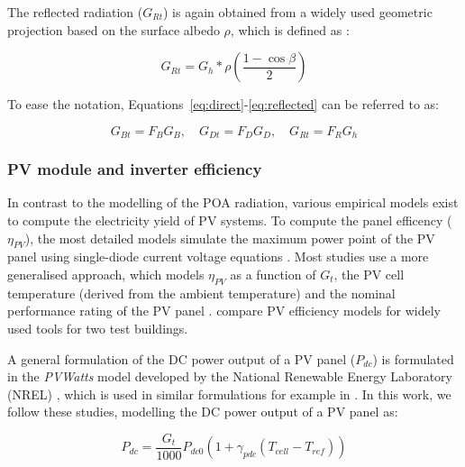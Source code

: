 The reflected radiation ($G_{Rt}$) is again obtained from a widely used geometric projection based on the surface albedo $\rho$, which is defined as \cite{duffie_solar_2013}:

\begin{equation}
\label{eq:reflected}
G_{Rt} = G_h * \rho \left( \frac{1-\cos \beta}{2} \right)
\end{equation}

To ease the notation, Equations~\ref{eq:direct}-\ref{eq:reflected} can be referred to as:

\begin{equation}
\label{eq:tilted_irrad_simplified}
G_{Bt} = F_B G_B, \quad G_{Dt} = F_D G_D, \quad G_{Rt} = F_R G_h
\end{equation}



\subsubsection{PV module and inverter efficiency}
\label{app:efficiency}

In contrast to the modelling of the POA radiation, various empirical models exist to compute the electricity yield of PV systems. 
To compute the panel efficency ($\eta_{PV}$), the most detailed models simulate the maximum power point of the PV panel using single-diode current voltage equations \cite{strzalka_large_2012,buffat_scalable_2018}.
Most studies use a more generalised approach, which models $\eta_{PV}$ as a function of $G_t$, the PV cell temperature (derived from the ambient temperature) and the nominal performance rating of the PV panel \cite{jakubiec_method_2013,calcabrini_simplified_2019,singh_estimation_2015,ramirez_camargo_spatio-temporal_2015,mainzer_assessment_2017}. \citet{jakubiec_method_2013} compare PV efficiency models for widely used tools for two test buildings.

A general formulation of the DC power output of a PV panel ($P_{dc}$) is formulated in the \textit{PVWatts} model developed by the National Renewable Energy Laboratory (NREL) \cite{dobos_pvwatts_2014}, which is used in similar formulations for example in \cite{jakubiec_method_2013,ramirez_camargo_spatio-temporal_2015,singh_estimation_2015,calcabrini_simplified_2019}. 
In this work, we follow these studies, modelling the DC power output of a PV panel as:

\begin{equation}
\label{eq:Pdc}
    P_{dc} = \frac{G_{t}}{1000} P_{dc0} (1 + \gamma_\mathit{pdc}(T_\mathit{cell}-T_\mathit{ref}))
\end{equation}

